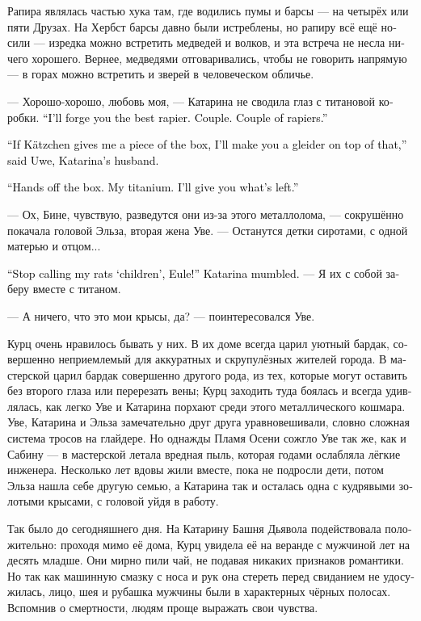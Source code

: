 \documentclass[a4paper,12pt,fleqn]{book}\usepackage{cooltooltips}\usepackage{polyglossia}\setdefaultlanguage[babelshorthands=true]{russian}\setotherlanguage{english}\defaultfontfeatures{Ligatures=TeX,Mapping=tex-text} \usepackage{xcolor}\definecolor{lightgray}{HTML}{bbbbbb}\color{lightgray}\newcommand{\ml}[3]{\textenglish{\textcolor{black}{#3}}}
\begin{document}
Рапира являлась частью хука там, где водились пумы и барсы --- на четырёх или пяти Друзах.
На Хербст барсы давно были истреблены, но рапиру всё ещё носили --- изредка можно встретить медведей и волков, и эта встреча не несла ничего хорошего.
Вернее, медведями отговаривались, чтобы не говорить напрямую --- в горах можно встретить и зверей в человеческом обличье.

--- Хорошо-хорошо, любовь моя, --- Катарина не сводила глаз с титановой коробки.
\ml{$0$}
{--- Лучшую рапиру тебе сделаю.}
{``I'll forge you the best rapier.}
\ml{$0$}
{Две.}
{Couple.}
\ml{$0$}
{Две рапиры.}
{Couple of rapiers.''}

\ml{$0$}
{--- Если Кэцхен отдаст мне кусок коробки, я и глайдер тебе сделаю, --- с хитрым прищуром влез в разговор Уве, муж Катарины.}
{``If K\"{a}tzchen gives me a piece of the box, I'll make you a gleider on top of that,'' said Uwe, Katarina's husband.}

\ml{$0$}
{--- Так, руки с коробки убрал.}
{``Hands off the box.}
\ml{$0$}
{Мой титан.}
{My titanium.}
\ml{$0$}
{Что останется --- отдам тебе.}
{I'll give you what's left.''}

--- Ох, Бине, чувствую, разведутся они из-за этого металлолома, --- сокрушённо покачала головой Эльза, вторая жена Уве.
--- Останутся детки сиротами, с одной матерью и отцом...

\ml{$0$}
{--- Хватит называть детками моих крыс, Ойле! --- буркнула Катарина.}
{``Stop calling my rats `children', Eule!'' Katarina mumbled.}
--- Я их с собой заберу вместе с титаном.

--- А ничего, что это мои крысы, да? --- поинтересовался Уве.

Курц очень нравилось бывать у них.
В их доме всегда царил уютный бардак, совершенно неприемлемый для аккуратных и скрупулёзных жителей города.
В мастерской царил бардак совершенно другого рода, из тех, которые могут оставить без второго глаза или перерезать вены;
Курц заходить туда боялась и всегда удивлялась, как легко Уве и Катарина порхают среди этого металлического кошмара.
Уве, Катарина и Эльза замечательно друг друга уравновешивали, словно сложная система тросов на глайдере.
Но однажды Пламя Осени сожгло Уве так же, как и Сабину --- в мастерской летала вредная пыль, которая годами ослабляла лёгкие инженера.
Несколько лет вдовы жили вместе, пока не подросли дети, потом Эльза нашла себе другую семью, а Катарина так и осталась одна с кудрявыми золотыми крысами, с головой уйдя в работу.

Так было до сегодняшнего дня.
На Катарину Башня Дьявола подействовала положительно: проходя мимо её дома, Курц увидела её на веранде с мужчиной лет на десять младше.
Они мирно пили чай, не подавая никаких признаков романтики.
Но так как машинную смазку с носа и рук она стереть перед свиданием не удосужилась, лицо, шея и рубашка мужчины были в характерных чёрных полосах.
Вспомнив о смертности, людям проще выражать свои чувства.
\end{document}
